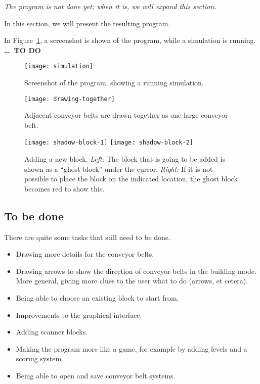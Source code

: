 \textit{The program is not done yet; when it is, we will expand this section.}

In this section, we will present the resulting program.

In Figure~\ref{fig:simulation}, a screenshot is shown of the program, while a simulation is running. \textbf{\ldots\ TO DO}

\begin{figure}
  \begin{center}
    \texttt{[image: simulation]}
    \caption{Screenshot of the program, showing a running simulation.}
    \label{fig:simulation}
  \end{center}
\end{figure}

\begin{figure}
  \begin{center}
    \texttt{[image: drawing-together]}
    \caption{Adjacent conveyor belts are drawn together as one large conveyor belt.}
    \label{fig:drawing-together}
  \end{center}
\end{figure}

\begin{figure}
  \begin{center}
    \texttt{[image: shadow-block-1]}
    \quad
    \texttt{[image: shadow-block-2]}
    \caption{Adding a new block. \textit{Left:} The block that is going to be added is shown as a ``ghost block'' under the cursor. \textit{Right:} If it is not possible to place the block on the indicated location, the ghost block becomes red to show this.}
    \label{fig:shadow-block}
  \end{center}
\end{figure}

\subsection{To be done}
There are quite some tasks that still need to be done.
\begin{itemize}
  \item Drawing more details for the conveyor belts.
  \item Drawing arrows to show the direction of conveyor belts in the building mode. More general, giving more clues to the user what to do (arrows, et cetera).
  \item Being able to choose an existing block to start from.
  \item Improvements to the graphical interface.
  \item Adding scanner blocks.
  \item Making the program more like a game, for example by adding levels and a scoring system.
  \item Being able to open and save conveyor belt systems.
\end{itemize}
